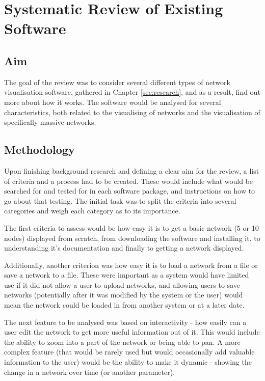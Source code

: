 \documentclass[../dissertation.tex]{subfiles}
\begin{document}
\chapter{Systematic Review of Existing Software}
\label{sec:systematic-review}

\section{Aim} 

The goal of the review was to consider several different types of network visualisation software, gathered in Chapter \ref{sec:research}, and as a result, find out more about how it works. The software would be analysed for several characteristics, both related to the visualising of networks and the visualisation of specifically massive networks.

\section{Methodology}
\label{sec:sys-rev-method}

Upon finishing background research and defining a clear aim for the review, a list of criteria and a process had to be created. These would include what would be searched for and tested for in each software package, and instructions on how to go about that testing. The initial task was to split the criteria into several categories and weigh each category as to its importance. 

The first criteria to assess would be how easy it is to get a basic network (5 or 10 nodes) displayed from scratch, from downloading the software and installing it, to understanding it's documentation and finally to getting a network displayed.

Additionally, another criterion was how easy it is to load a network from a file or save a network to a file. These were important as a system would have limited use if it did not allow a user to upload networks, and allowing users to save networks (potentially after it was modified by the system or the user) would mean the network could be loaded in from another system or at a later date. 

The next feature to be analysed was based on interactivity - how easily can a user edit the network to get more useful information out of it. This would include the ability to zoom into a part of the network or being able to pan. A more complex feature (that would be rarely used but would occasionally add valuable information to the user) would be the ability to make it dynamic - showing the change in a network over time (or another parameter). 
\end{document}
